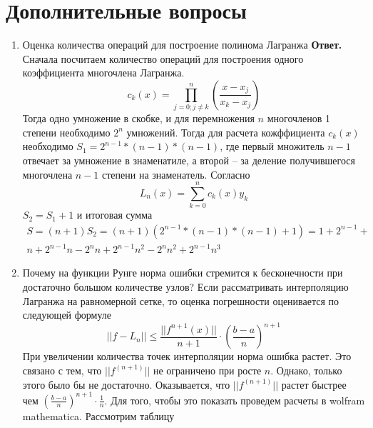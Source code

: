 \documentclass{article}
\begin{document}
    \newpage
    \section{Дополнительные вопросы}
    \begin{enumerate}
        \item Оценка количества операций для построение полинома Лагранжа
        \newline
        {\bfseries Ответ. } 
        Сначала посчитаем количество операций для построения одного коэффициента многочлена Лагранжа.
        \begin{equation*}
            c_k(x) = \prod_{j=0;j\neq k}^{n} \left(\dfrac{x-x_j}{x_k - x_j}\right)
        \end{equation*}
        Тогда одно умножение в скобке, и для перемножения $n$ многочленов 1 степени необходимо $2^n$ умножений. Тогда для 
        расчета кожффициента $ c_k(x)$ необходимо $S_1 = 2^{n-1} * (n-1) * (n-1)$, где 
        первый множитель $n-1$ отвечает за умножение в знаменатиле, а второй -- за деление получившегося многочлена $n-1$ степени 
        на знаменатель. 
        Согласно
        \begin{equation*}
            L_n(x) = \sum_{k=0}^{n} c_k(x)  y_k
        \end{equation*}
        $S_2 = S_1 + 1$ и итоговая сумма 
        \begin{gather*}
            S = (n+1)S_2 = (n+1)( 2^{n-1} * (n-1) * (n-1) + 1) = 1 + 2^{n-1} +\\ 
            n + 2^{n-1} n - 2^n n + 2^{n-1} n^2 - 
            2^n n^2 + 2^{n-1} n^3
        \end{gather*}
        \item Почему на функции Рунге норма ошибки стремится к бесконечности при достаточно большом количестве узлов?
        \newline
        Если рассматривать интерполяцию Лагранжа на равномерной сетке, то оценка погрешности оценивается по следующей формуле
        \[
        ||f-L_n|| \le \frac{||f^{n+1}(x)||}{n+1} \cdot (\frac{b-a}{n})^{n+1}
        \]
        При увеличении количества точек интерполяции норма ошибка растет. Это связано с тем, что $||f^(n+1)||$ не ограничено при росте $n$. Однако, только этого было бы не достаточно. Оказывается, что $||f^{(n+1)}||$ растет быстрее чем $(\frac{b-a}{n})^{n+1} \cdot \frac{1}{n}$. Для того, чтобы это показать проведем расчеты в wolfram mathematica. Рассмотрим таблицу
        \begin{table}[H]
        	\centering

\end{table}
\end{enumerate}
\end{document}
